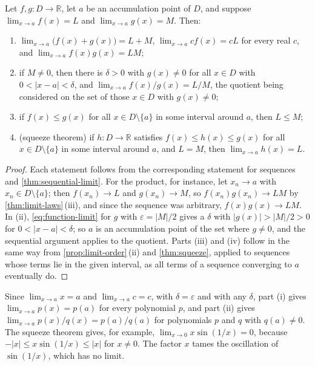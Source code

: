 \begin{theorem}
\label{thm:function-limit-laws}
Let $f,g\colon D\to\mathbb R$, let $a$ be an accumulation point of $D$, and suppose $\lim_{x\to a}f(x)=L$ and $\lim_{x\to a}g(x)=M$. Then:
\begin{enumerate}
\item $\lim_{x\to a}\bigl(f(x)+g(x)\bigr)=L+M$, $\lim_{x\to a}cf(x)=cL$ for every real $c$, and $\lim_{x\to a}f(x)g(x)=LM$;
\item if $M\ne0$, then there is $\delta>0$ with $g(x)\ne0$ for all $x\in D$ with $0<|x-a|<\delta$, and $\lim_{x\to a}f(x)/g(x)=L/M$, the quotient being considered on the set of those $x\in D$ with $g(x)\ne0$;
\item if $f(x)\le g(x)$ for all $x\in D\setminus\{a\}$ in some interval around $a$, then $L\le M$;
\item (squeeze theorem) if $h\colon D\to\mathbb R$ satisfies $f(x)\le h(x)\le g(x)$ for all $x\in D\setminus\{a\}$ in some interval around $a$, and $L=M$, then $\lim_{x\to a}h(x)=L$.
\end{enumerate}
\end{theorem}

\begin{proof}
Each statement follows from the corresponding statement for sequences and \cref{thm:sequential-limit}. For the product, for instance, let $x_n\to a$ with $x_n\in D\setminus\{a\}$; then $f(x_n)\to L$ and $g(x_n)\to M$, so $f(x_n)g(x_n)\to LM$ by \cref{thm:limit-laws}\,(iii), and since the sequence was arbitrary, $f(x)g(x)\to LM$. In (ii), \eqref{eq:function-limit} for $g$ with $\varepsilon=|M|/2$ gives a $\delta$ with $|g(x)|>|M|/2>0$ for $0<|x-a|<\delta$; so $a$ is an accumulation point of the set where $g\ne0$, and the sequential argument applies to the quotient. Parts (iii) and (iv) follow in the same way from \cref{prop:limit-order}\,(ii) and \cref{thm:squeeze}, applied to sequences whose terms lie in the given interval, as all terms of a sequence converging to $a$ eventually do.
\end{proof}

Since $\lim_{x\to a}x=a$ and $\lim_{x\to a}c=c$, with $\delta=\varepsilon$ and with any $\delta$, part (i) gives $\lim_{x\to a}p(x)=p(a)$ for every polynomial $p$, and part (ii) gives $\lim_{x\to a}p(x)/q(x)=p(a)/q(a)$ for polynomials $p$ and $q$ with $q(a)\ne0$. The squeeze theorem gives, for example, $\lim_{x\to0}x\sin(1/x)=0$, because $-|x|\le x\sin(1/x)\le|x|$ for $x\ne0$. The factor $x$ tames the oscillation of $\sin(1/x)$, which has no limit.


